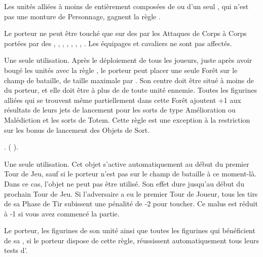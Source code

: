 \endpricelist

\armytalismans

\startpricelist

Les unités alliées à moins de  entièrement composées de \razortusks{} ou d'un seul \chariot{}, qui n'est pas une monture de Personnage, gagnent la règle \vanguard{}.

Le porteur ne peut être touché que sur des  par les Attaques de Corps à Corps portées par des \warbeasts{}, \swarms{}, \cavalry{}, \chariots{}, \monstrousbeasts{}, \monstrouscavalry{}, \monsters{}, \riddenmonsters{}. Les équipages et cavaliers ne sont pas affectés.

\endpricelist

\armyenchanteditems

\startpricelist

Une seule utilisation. Après le déploiement de tous les joueurs, juste après avoir bougé les unités avec la règle \vanguard{}, le porteur peut placer une seule Forêt sur le champ de bataille,  de taille maximale  par . Son centre doit être situé à moins de  du porteur, et elle doit être à plus de  de toute unité ennemie. Toutes les figurines alliées qui se trouvent même partiellement dans cette Forêt ajoutent +1 aux résultats de leurs jets de lancement pour les sorts de type Amélioration ou Malédiction et les sorts de Totem. Cette règle est une exception à la restriction sur les bonus de lancement des Objets de Sort.

. \wildernessspellone{} (\Pathof{} \wilderness{}).

Une seule utilisation. Cet objet s'active automatiquement au début du premier Tour de Jeu, sauf si le porteur n'est pas sur le champ de bataille à ce moment-là. Dans ce cas, l'objet ne peut pas être utilisé. Son effet dure jusqu'au début du prochain Tour de Jeu. Si l'adversaire a eu le premier Tour de Joueur, tous les tirs de sa Phase de Tir subissent une pénalité de -2 pour toucher. Ce malus est réduit à -1 si vous avez commencé la partie.

Le porteur, les figurines de son unité ainsi que toutes les figurines qui bénéficient de sa \inspiringpresence{}, si le porteur dispose de cette règle, réussissent automatiquement tous leurs tests d'\primalinstinct{}.

